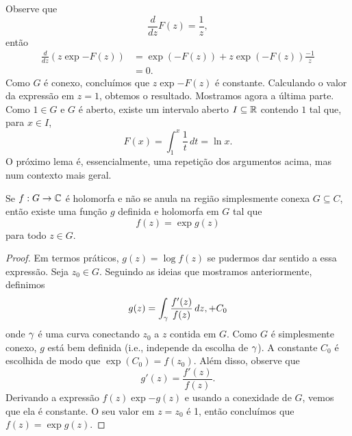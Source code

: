     Observe que 
    \begin{equation*}
        \frac{d}{dz}F(z) = \frac{1}{z},
    \end{equation*}    
    então 
    \begin{align*}
        \frac{d}{dz}(z\exp{-F(z)}) &= \exp{(-F(z))} + z\exp{(-F(z))}\frac{-1}{z} \\
        & = 0.
    \end{align*}
    Como $G$ é conexo, concluímos que $z\exp{-F(z)}$ é constante. Calculando o 
    valor da expressão em $z = 1$, obtemos o resultado. Mostramos agora a última
    parte. Como $1 \in G$ e $G$ é aberto, existe um intervalo aberto 
    $I \subseteq \mathbb{R}$ contendo $1$ tal que, para $x \in I$,
    \begin{equation*}
        F(x) = \int_{1}^{x} \frac{1}{t} \, dt = \ln{x}.
    \end{equation*}    
    O próximo lema é, essencialmente, uma repetição dos argumentos acima, mas 
    num contexto mais geral.
    \begin{lema}%
    \label{lema-ramo-log}
        Se $f : G \to \mathbb{C}$ é holomorfa e não se anula na região simplesmente conexa 
        $G \subseteq C$, então existe uma função $g$ definida e holomorfa em $G$ 
        tal que 
        \begin{equation*}
            f(z) = \exp{g(z)}
        \end{equation*}
        para todo $z \in G$.
    \end{lema}
    \begin{proof}
        Em termos práticos, $g(z) = \log f(z)$ se pudermos dar sentido a essa
        expressão. Seja $z_0 \in G$. Seguindo as ideias que mostramos anteriormente,
        definimos
        \begin{equation*}
            g(z) = \int_{\gamma} \frac{f'(z)}{f(z)} \, dz, + C_0
        \end{equation*}
        onde $\gamma$ é uma curva conectando $z_0$ a $z$ contida em $G$. Como $G$ é
        simplesmente conexo, $g$ está bem definida (i.e., independe da escolha de
        $\gamma$). A constante $C_0$ é escolhida de modo que $\exp(C_0) = f(z_0)$. 
        Além disso, observe que 
        \begin{equation*}
            g'(z) = \frac{f'(z)}{f(z)}.
        \end{equation*}
        Derivando a expressão $f(z)\exp{-g(z)}$ e usando a conexidade de $G$, vemos
        que ela é constante. O seu valor em $z = z_0$ é 1, então concluímos que 
        $f(z) = \exp{g(z)}$.
    \end{proof}
    
